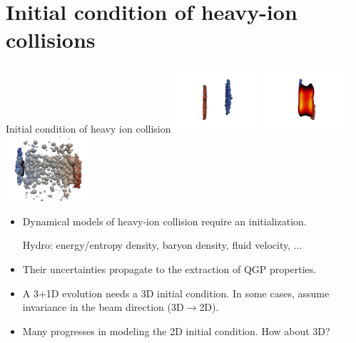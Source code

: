 \documentclass[11pt]{beamer}
\begin{document}
\section{Initial condition of heavy-ion collisions}
\begin{frame}{Initial condition of heavy ion collision}
\includegraphics[width=0.24\textwidth]{new1.png}
\includegraphics[width=0.24\textwidth]{new100.png}
\includegraphics[width=0.24\textwidth]{new300.png}
\begin{itemize}
\item Dynamical models of heavy-ion collision require an initialization.\\
\begin{center}
Hydro: energy/entropy density, baryon density, fluid velocity, ...
\end{center}
\item Their uncertainties propagate to the extraction of QGP properties.
\item A 3+1D evolution needs a 3D initial condition. In some cases, assume invariance in the beam direction (3D$\rightarrow$2D).
\item Many progresses in modeling the 2D initial condition. How about 3D?

\end{itemize}
\end{frame}
\end{document}
